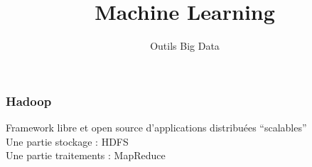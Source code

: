 \documentclass{formation}
\title{Machine Learning}
\subtitle{Outils Big Data}
\begin{document}
\maketitle

\begin{frame}
  \frametitle{Hadoop}
  Framework libre et open source d'applications distribuées ``scalables'' \\
  Une partie stockage : HDFS \\
  Une partie traitements : MapReduce
\end{frame}
\end{document}
